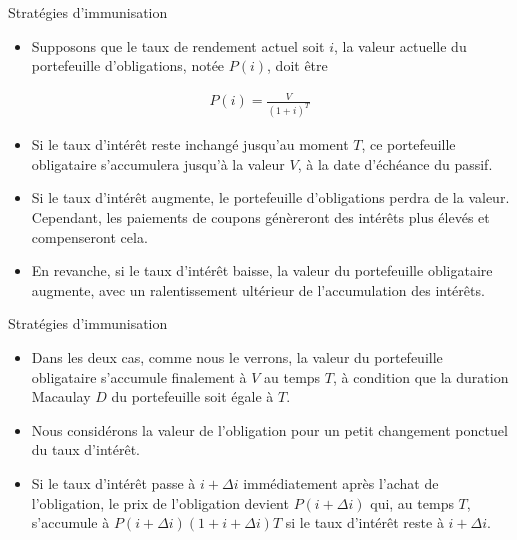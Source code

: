 \documentclass[10pt,a4paper]{beamer}
\begin{document}
\begin{frame}{Stratégies d'immunisation}
\begin{itemize}[label=\bullet]
\item Supposons que le taux de rendement actuel soit $i$, la valeur actuelle du portefeuille d'obligations, notée $P(i)$, doit être
\end{itemize}
\begin{align*}
P(i)=\frac{V}{(1+i)^T}
\end{align*}
\begin{itemize}[label=\bullet]
\item Si le taux d'intérêt reste inchangé jusqu'au moment $T$,  ce portefeuille obligataire s'accumulera jusqu'à la valeur $V$, à la date d'échéance du passif.
\item Si le taux d'intérêt augmente, le portefeuille d'obligations perdra de la valeur. Cependant, les paiements de coupons génèreront des intérêts plus élevés et compenseront cela.
\item En revanche, si le taux d'intérêt baisse, la valeur du portefeuille obligataire augmente, avec un ralentissement ultérieur de l'accumulation des intérêts.
\end{itemize}
\end{frame}


\begin{frame}{Stratégies d'immunisation}
\begin{itemize}[label=\bullet]
\item Dans les deux cas, comme nous le verrons, la valeur du portefeuille obligataire s’accumule finalement à $V$ au temps $T$, à condition que la duration Macaulay $D$ du portefeuille soit égale à $T$.
\item Nous considérons la valeur de l'obligation pour un petit changement ponctuel du taux d'intérêt.
\item Si le taux d'intérêt passe à $i + \Delta i$ immédiatement après l'achat de l'obligation, le prix de l'obligation devient $P(i + \Delta i)$ qui, au temps $T$, s'accumule à $P(i + \Delta i) (1 + i + \Delta i) T$ si le taux d'intérêt reste à $i + \Delta i$.
\end{itemize}
\end{frame}
\end{document}
